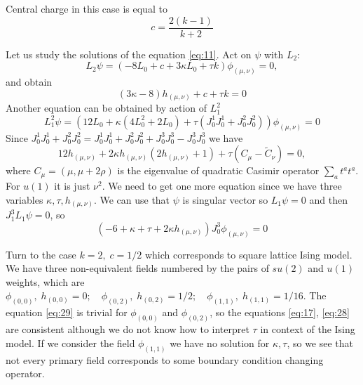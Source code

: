 Central charge in this case is equal to
\begin{equation}
  \label{eq:14}
  c=\frac{2(k-1)}{k+2}
\end{equation}

Let us study the solutions of the equation \eqref{eq:11}. Act on $\psi$ with $L_{2}$:
\begin{equation}
  \label{eq:13}
  L_{2}\psi=(-8L_{0}+c+3\kappa L_{0}+\tau k)\phi_{(\mu,\nu)}=0,
\end{equation}
and obtain
\begin{equation}
  \label{eq:28}
  (3\kappa-8) h_{(\mu,\nu)}+c+\tau k =0
\end{equation}
Another equation can be obtained by action of $L_{1}^{2}$
\begin{equation}
  \label{eq:15}
  L_{1}^{2}\psi = (12 L_{0} + \kappa(4 L_{0}^{2}+2 L_{0}) +\tau (J_{0}^{1}J_{0}^{1}+J_{0}^{2}J_{0}^{2}))\phi_{(\mu,\nu)}=0
\end{equation}
Since $J_{0}^{1}J_{0}^{1}+J_{0}^{2}J_{0}^{2}=J_{0}^{1}J_{0}^{1}+J_{0}^{2}J_{0}^{2}+J_{0}^{3}J_{0}^{3}-J_{0}^{3}J_{0}^{3}$ we have
\begin{equation}
  \label{eq:17}
  12 h_{(\mu,\nu)}+2\kappa h_{(\mu,\nu)} (2h_{(\mu,\nu)}+1) +  \tau (C_{\mu}-\tilde{C}_{\nu})=0,
\end{equation}
where $C_{\mu}=(\mu,\mu+2\rho)$ is the eigenvalue of quadratic Casimir operator $\sum_{a}t^{a}t^{a}$. For $u(1)$ it is just $\nu^{2}$.
We need to get one more equation since we have three variables $\kappa,\tau,h_{(\mu,\nu)}$. We can use that $\psi$ is singular vector so $L_{1}\psi=0$ and then $J_{1}^{3}L_{1}\psi=0$, so
\begin{equation}
  \label{eq:29}
  \left(-6  + \kappa +  \tau +  2 \kappa h_{(\mu,\nu)}\right) J^{3}_{0} \phi_{(\mu,\nu)}=0
\end{equation}


Turn to the case $k=2, \;c=1/2$ which corresponds to square lattice Ising model. We have three non-equivalent fields numbered by the pairs of $su(2)$ and $u(1)$ weights, which are $\phi_{(0,0)}, \; h_{(0,0)}=0; \quad \phi_{(0,2)}, \; h_{(0,2)}=1/2; \quad \phi_{(1,1)}, \; h_{(1,1)}=1/16$.
The equation \eqref{eq:29} is trivial for $\phi_{(0,0)}$ and $\phi_{(0,2)}$, so the equations \eqref{eq:17}, \eqref{eq:28} are consistent although we do not know how to interpret $\tau$ in context of the Ising model. If we consider the field $\phi_{(1,1)}$ we have no solution for $\kappa,\tau$, so we see that not every primary field corresponds to some boundary condition changing operator. 

